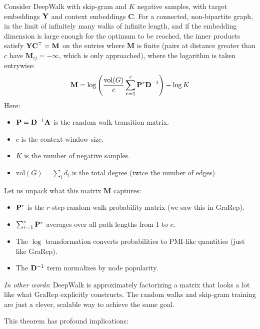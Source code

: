 \begin{notechapter}
\begin{theorem}
Consider DeepWalk with skip-gram and $K$ negative samples, with target embeddings $\mathbf{Y}$ and context embeddings $\mathbf C$. For a connected, non-bipartite graph, in the limit of infinitely many walks of infinite length, and if the embedding dimension is large enough for the optimum to be reached, the inner products satisfy $\mathbf{Y}\mathbf C^\top = \mathbf M$ on the entries where $\mathbf M$ is finite (pairs at distance greater than $c$ have $\mathbf M_{ij} = -\infty$, which is only approached), where the logarithm is taken entrywise:
\[
\mathbf{M} = \log\left(\frac{\text{vol}(G)}{c} \sum_{r=1}^{c} \mathbf{P}^r \mathbf{D}^{-1}\right) - \log K
\]
Here:
\begin{itemize}
    \item $\mathbf{P} = \mathbf{D}^{-1}\mathbf{A}$ is the random walk transition matrix.
    \item $c$ is the context window size.
    \item $K$ is the number of negative samples.
    \item $\text{vol}(G) = \sum_i d_i$ is the total degree (twice the number of edges).
\end{itemize}
\end{theorem}

\begin{intuition}
Let us unpack what this matrix $\mathbf{M}$ captures:

\begin{itemize}
    \item $\mathbf{P}^r$ is the $r$-step random walk probability matrix (we saw this in GraRep).
    \item $\sum_{r=1}^{c} \mathbf{P}^r$ averages over all path lengths from 1 to $c$.
    \item The $\log$ transformation converts probabilities to PMI-like quantities (just like GraRep).
    \item The $\mathbf{D}^{-1}$ term normalizes by node popularity.
\end{itemize}

\emph{In other words}: DeepWalk is approximately factorizing a matrix that looks a lot like what GraRep explicitly constructs. The random walks and skip-gram training are just a clever, scalable way to achieve the same goal.
\end{intuition}

\begin{keyidea}
This theorem has profound implications:


\end{keyidea}
\end{notechapter}
